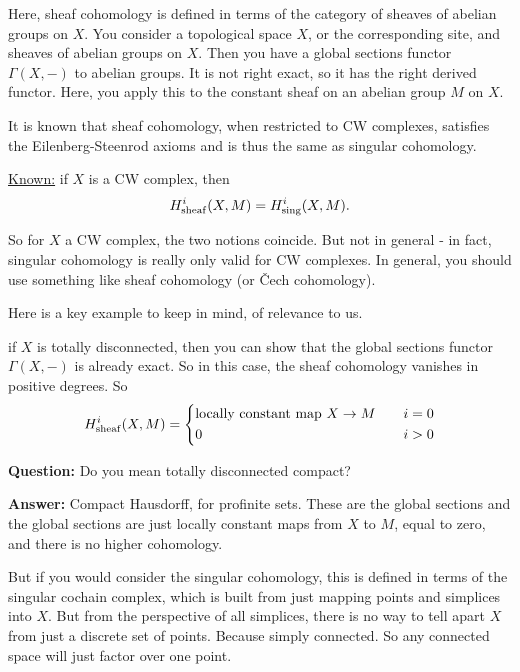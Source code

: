 Here, sheaf cohomology is defined in terms of the category of sheaves of abelian groups on $X$. You consider a topological space $X$, or the corresponding site, and sheaves of abelian groups on $X$. 
Then you have a global sections functor $\Gamma(X,-)$ to abelian groups. 
It is not right exact, so it has the right derived functor. 
Here, you apply this to the constant sheaf on an abelian group $M$ on $X$.

It is known that sheaf cohomology, when restricted to CW complexes, satisfies the Eilenberg-Steenrod axioms and is thus the same as singular cohomology. 


\underline{Known:} if $X$ is a CW complex, then 
\begin{align*}
H^i_{\mathrm{sheaf}}(X,M) = H^i_{\mathrm{sing}}(X,M).
\end{align*}

So for $X$ a CW complex, the two notions coincide. But not in general - in fact, singular cohomology is really only valid for CW complexes. In general, you should use something like sheaf cohomology (or \v{C}ech cohomology).

Here is a key example to keep in mind, of relevance to us. 

\begin{example}
if $X$ is totally disconnected, then you can show that the global sections functor $\Gamma(X, -)$ is already exact. So in this case, the sheaf cohomology vanishes in positive degrees.
So
\begin{align*}
H^i_{\mathrm{sheaf}}(X,M) = 
\left\{
    \begin {aligned}
         & \text{locally constant map $X \to M$} \quad & i = 0 \\
         & 0 \quad & i > 0                
    \end{aligned}
\right.
\end{align*}
\end{example}

\textbf{Question:} Do you mean totally disconnected compact?

\textbf{Answer:} Compact Hausdorff, for profinite sets. These are the global sections and the global sections are just locally constant maps from $X$ to $M$, equal to zero, and there is no higher cohomology.

But if you would consider the singular cohomology, this is defined in terms of the singular cochain complex, which is built from just mapping points and simplices into $X$. 
But from the perspective of all simplices, there is no way to tell apart $X$ from just a discrete set of points. Because simply connected. So any connected space will just factor over one point.

